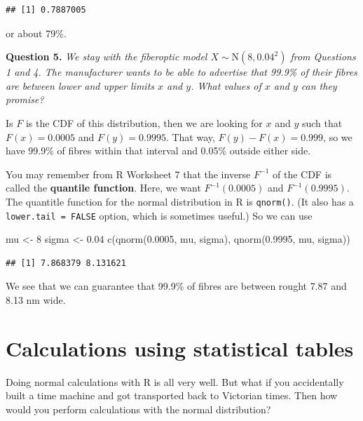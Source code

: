 \documentclass[
  a4paper,
]{book}
\newenvironment{Shaded}{\begin{snugshade}}{\end{snugshade}}
\newcommand{\DecValTok}[1]{\textcolor[rgb]{0.00,0.00,0.81}{#1}}
\newcommand{\FloatTok}[1]{\textcolor[rgb]{0.00,0.00,0.81}{#1}}
\newcommand{\FunctionTok}[1]{\textcolor[rgb]{0.00,0.00,0.00}{#1}}
\newcommand{\NormalTok}[1]{#1}
\newcommand{\OtherTok}[1]{\textcolor[rgb]{0.56,0.35,0.01}{#1}}
\theoremstyle{definition}
\theoremstyle{definition}
\theoremstyle{definition}
\theoremstyle{definition}
\theoremstyle{remark}
\begin{document}
\begin{verbatim}
## [1] 0.7887005
\end{verbatim}

or about 79\%.

\textbf{Question 5.} \emph{We stay with the fiberoptic model \(X \sim \mathrm{N}(8, 0.04^2)\) from Questions 1 and 4. The manufacturer wants to be able to advertise that 99.9\% of their fibres are between lower and upper limits \(x\) and \(y\). What values of \(x\) and \(y\) can they promise?}

Is \(F\) is the CDF of this distribution, then we are looking for \(x\) and \(y\) such that \(F(x) = 0.0005\) and \(F(y) = 0.9995\). That way, \(F(y) - F(x) = 0.999\), so we have 99.9\% of fibres within that interval and 0.05\% outside either side.

You may remember from R Worksheet 7 that the inverse \(F^{-1}\) of the CDF is called the \textbf{quantile function}. Here, we want \(F^{-1}(0.0005)\) and \(F^{-1}(0.9995)\). The quantitle function for the normal distribution in R is \texttt{qnorm()}. (It also has a \texttt{lower.tail\ =\ FALSE} option, which is sometimes useful.) So we can use

\begin{Shaded}
\begin{Highlighting}[]
\NormalTok{mu }\OtherTok{\textless{}{-}} \DecValTok{8}
\NormalTok{sigma }\OtherTok{\textless{}{-}} \FloatTok{0.04}
\FunctionTok{c}\NormalTok{(}\FunctionTok{qnorm}\NormalTok{(}\FloatTok{0.0005}\NormalTok{, mu, sigma), }\FunctionTok{qnorm}\NormalTok{(}\FloatTok{0.9995}\NormalTok{, mu, sigma))}
\end{Highlighting}
\end{Shaded}

\begin{verbatim}
## [1] 7.868379 8.131621
\end{verbatim}

We see that we can guarantee that 99.9\% of fibres are between rought 7.87 and 8.13 nm wide.

\hypertarget{normal-tables}{%
\section{Calculations using statistical tables}\label{normal-tables}}

Doing normal calculations with R is all very well. But what if you accidentally built a time machine and got transported back to Victorian times. Then how would you perform calculations with the normal distribution?
\end{document}
